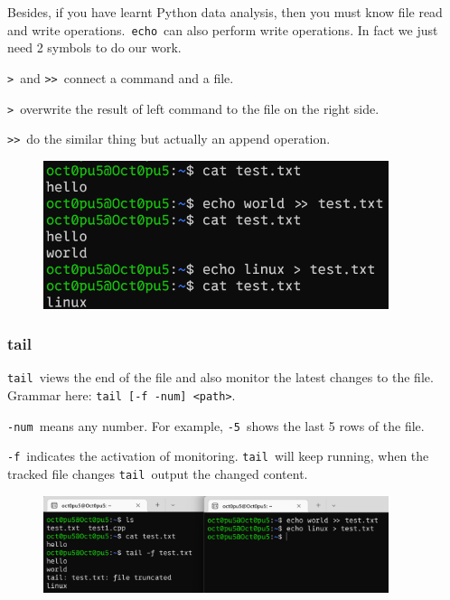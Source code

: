 \documentclass[12pt]{ctexart}
\begin{document}
Besides, if you have learnt Python data analysis, then you must know
file read and write operations.\ \texttt{echo}\ can also perform write
operations. In fact we just need 2 symbols to do our work.

\texttt{\textgreater{}}\ and \texttt{\textgreater{}\textgreater{}}\
connect a command and a file.

\texttt{\textgreater{}}\ overwrite the result of left command to the file
on the right side.

\texttt{\textgreater{}\textgreater{}}\ do the similar thing but actually
an append operation.

\begin{figure}[H]
    \centering
    \includegraphics[width=0.9\textwidth,keepaspectratio]{assets/Linux/1.5 Linux file commands/14.png}
\end{figure}

\subsubsection{\textbf{tail}}

\texttt{tail}\ views the end of the file and also monitor the latest
changes to the file. Grammar here:
\texttt{tail\ {[}-f\ -num{]}\ \textless{}path\textgreater{}}.

\texttt{-num}\ means any number. For example, \texttt{-5}\ shows the last
5 rows of the file.

\texttt{-f}\ indicates the activation of monitoring. \texttt{tail}\ will
keep running, when the tracked file changes \texttt{tail}\ output the
changed content.

\begin{figure}[H]
    \centering
    \includegraphics[width=0.9\textwidth,keepaspectratio]{assets/Linux/1.5 Linux file commands/15.png}
\end{figure}
\end{document}
